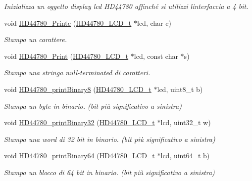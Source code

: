 \begin{DoxyCompactItemize}
\begin{DoxyCompactList}\small\item\em Inizializza un oggetto display lcd H\+D44780 affinché si utilizzi l\textquotesingle{}interfaccia a 4 bit. \end{DoxyCompactList}\item 
void \hyperlink{group___h_d44780_ga57b8c6ca0b3c12e5f7273b3c373a6f17}{H\+D44780\+\_\+\+Printc} (\hyperlink{struct_h_d44780___l_c_d__t}{H\+D44780\+\_\+\+L\+C\+D\+\_\+t} $\ast$lcd, char c)
\begin{DoxyCompactList}\small\item\em Stampa un carattere. \end{DoxyCompactList}\item 
void \hyperlink{group___h_d44780_ga3aedff8e2040e62db569fde955d3987b}{H\+D44780\+\_\+\+Print} (\hyperlink{struct_h_d44780___l_c_d__t}{H\+D44780\+\_\+\+L\+C\+D\+\_\+t} $\ast$lcd, const char $\ast$s)
\begin{DoxyCompactList}\small\item\em Stampa una stringa null-\/terminated di caratteri. \end{DoxyCompactList}\item 
void \hyperlink{group___h_d44780_ga2a5d4d528175321c46c790b581959e63}{H\+D44780\+\_\+print\+Binary8} (\hyperlink{struct_h_d44780___l_c_d__t}{H\+D44780\+\_\+\+L\+C\+D\+\_\+t} $\ast$lcd, uint8\+\_\+t b)
\begin{DoxyCompactList}\small\item\em Stampa un byte in binario. (bit più significativo a sinistra) \end{DoxyCompactList}\item 
void \hyperlink{group___h_d44780_ga95cceef2401c5519295e5a83c6688b5c}{H\+D44780\+\_\+print\+Binary32} (\hyperlink{struct_h_d44780___l_c_d__t}{H\+D44780\+\_\+\+L\+C\+D\+\_\+t} $\ast$lcd, uint32\+\_\+t w)
\begin{DoxyCompactList}\small\item\em Stampa una word di 32 bit in binario. (bit più significativo a sinistra) \end{DoxyCompactList}\item 
void \hyperlink{group___h_d44780_ga0f99bc5458acb172d0f3bfeb94f90e2a}{H\+D44780\+\_\+print\+Binary64} (\hyperlink{struct_h_d44780___l_c_d__t}{H\+D44780\+\_\+\+L\+C\+D\+\_\+t} $\ast$lcd, uint64\+\_\+t b)
\begin{DoxyCompactList}\small\item\em Stampa un blocco di 64 bit in binario. (bit più significativo a sinistra) \end{DoxyCompactList}\item 

\end{DoxyCompactItemize}
